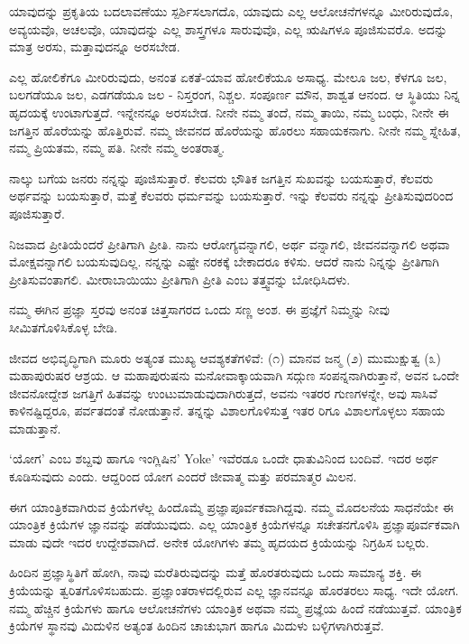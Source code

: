 ಯಾವುದನ್ನು ಪ್ರಕೃತಿಯ ಬದಲಾವಣೆಯು ಸ್ಪರ್ಶಿಸಲಾಗದೊ, ಯಾವುದು ಎಲ್ಲ ಆಲೋಚನೆಗಳನ್ನೂ ಮೀರಿರುವುದೊ, ಅವ್ಯಯವೊ, ಅಚಲವೊ, ಯಾವುದನ್ನು ಎಲ್ಲ ಶಾಸ್ತ್ರಗಳೂ ಸಾರುವುವೊ, ಎಲ್ಲ ಋಷಿಗಳೂ ಪೂಜಿಸುವರೊ. ಅದನ್ನು ಮಾತ್ರ ಅರಸು, ಮತ್ತಾವುದನ್ನೂ ಅರಸಬೇಡ.

ಎಲ್ಲ ಹೋಲಿಕೆಗೂ ಮೀರಿರುವುದು, ಅನಂತ ಏಕತೆ-ಯಾವ ಹೋಲಿಕೆಯೂ ಅಸಾಧ್ಯ. ಮೇಲೂ ಜಲ, ಕೆಳಗೂ ಜಲ, ಬಲಗಡೆಯೂ ಜಲ, ಎಡಗಡೆಯೂ ಜಲ - ನಿಸ್ತರಂಗ, ನಿಶ್ಚಲ. ಸಂಪೂರ್ಣ ಮೌನ, ಶಾಶ್ವತ ಆನಂದ. ಆ ಸ್ಥಿತಿಯು ನಿನ್ನ ಹೃದಯಕ್ಕೆ ಉಂಟಾಗುತ್ತದೆ. ಇನ್ನೇನನ್ನೂ ಅರಸಬೇಡ. ನೀನೇ ನಮ್ಮ ತಂದೆ, ನಮ್ಮ ತಾಯಿ, ನಮ್ಮ ಬಂಧು, ನೀನೇ ಈ ಜಗತ್ತಿನ ಹೊರೆಯನ್ನು ಹೊತ್ತಿರುವೆ. ನಮ್ಮ ಜೀವನದ ಹೊರೆಯನ್ನು ಹೊರಲು ಸಹಾಯಕನಾಗು. ನೀನೇ ನಮ್ಮ ಸ್ನೇಹಿತ, ನಮ್ಮ ಪ್ರಿಯತಮ, ನಮ್ಮ ಪತಿ. ನೀನೇ ನಮ್ಮ ಅಂತರಾತ್ಮ.

ನಾಲ್ಕು ಬಗೆಯ ಜನರು ನನ್ನನ್ನು ಪೂಜಿಸುತ್ತಾರೆ. ಕೆಲವರು ಭೌತಿಕ ಜಗತ್ತಿನ ಸುಖವನ್ನು ಬಯಸುತ್ತಾರೆ, ಕೆಲವರು ಅರ್ಥವನ್ನು ಬಯಸುತ್ತಾರೆ, ಮತ್ತೆ ಕೆಲವರು ಧರ್ಮವನ್ನು ಬಯಸುತ್ತಾರೆ. ಇನ್ನು ಕೆಲವರು ನನ್ನನ್ನು ಪ್ರೀತಿಸುವುದರಿಂದ ಪೂಜಿಸುತ್ತಾರೆ.

ನಿಜವಾದ ಪ್ರೀತಿಯೆಂದರೆ ಪ್ರೀತಿಗಾಗಿ ಪ್ರೀತಿ. ನಾನು ಆರೋಗ್ಯವನ್ನಾಗಲಿ, ಅರ್ಥ ವನ್ನಾಗಲಿ, ಜೀವನವನ್ನಾಗಲಿ ಅಥವಾ ಮೋಕ್ಷವನ್ನಾಗಲಿ ಬಯಸುವುದಿಲ್ಲ. ನನ್ನನ್ನು ಎಷ್ಟೇ ನರಕಕ್ಕೆ ಬೇಕಾದರೂ ಕಳಿಸು. ಆದರೆ ನಾನು ನಿನ್ನನ್ನು ಪ್ರೀತಿಗಾಗಿ ಪ್ರೀತಿಸುವಂತಾಗಲಿ. ಮೀರಾಬಾಯಿಯು ಪ್ರೀತಿಗಾಗಿ ಪ್ರೀತಿ ಎಂಬ ತತ್ತ್ವವನ್ನು ಬೋಧಿಸಿದಳು.

ನಮ್ಮ ಈಗಿನ ಪ್ರಜ್ಞಾ ಸ್ತರವು ಅನಂತ ಚಿತ್ತಸಾಗರದ ಒಂದು ಸಣ್ಣ ಅಂಶ. ಈ ಪ್ರಜ್ಞೆಗೆ ನಿಮ್ಮನ್ನು ನೀವು ಸೀಮಿತಗೊಳಿಸಿಕೊಳ್ಳ ಬೇಡಿ.

ಜೀವದ ಅಭಿವೃದ್ಧಿಗಾಗಿ ಮೂರು ಅತ್ಯಂತ ಮುಖ್ಯ ಆವಶ್ಯಕತೆಗಳಿವೆ: (೧) ಮಾನವ ಜನ್ಮ (೨) ಮುಮುಕ್ಷುತ್ವ (೩) ಮಹಾಪುರುಷರ ಆಶ್ರಯ. ಆ ಮಹಾಪುರುಷನು ಮನೋವಾಕ್ಕಾಯವಾಗಿ ಸದ್ಗುಣ ಸಂಪನ್ನನಾಗಿರುತ್ತಾನೆ, ಅವನ ಒಂದೇ ಜೀವನೋದ್ದೇಶ ಜಗತ್ತಿಗೆ ಹಿತವನ್ನು ಉಂಟುಮಾಡುವುದಾಗಿರುತ್ತದೆ, ಅವನು ಇತರರ ಗುಣಗಳನ್ನೇ, ಅವು ಸಾಸಿವೆ ಕಾಳಿನಷ್ಟಿದ್ದರೂ, ಪರ್ವತದಂತೆ ನೋಡುತ್ತಾನೆ. ತನ್ನನ್ನು ವಿಶಾಲಗೊಳಿಸುತ್ತ ಇತರ ರಿಗೂ ವಿಶಾಲಗೊಳ್ಳಲು ಸಹಾಯ ಮಾಡುತ್ತಾನೆ.

‘ಯೋಗ’ ಎಂಬ ಶಬ್ದವು ಹಾಗೂ ಇಂಗ್ಲಿಷಿನ’ Yoke’ ಇವೆರಡೂ ಒಂದೇ ಧಾತುವಿನಿಂದ ಬಂದಿವೆ. ಇದರ ಅರ್ಥ ಕೂಡಿಸುವುದು ಎಂದು. ಆದ್ದರಿಂದ ಯೋಗ ಎಂದರೆ ಜೀವಾತ್ಮ ಮತ್ತು ಪರಮಾತ್ಮರ ಮಿಲನ.

ಈಗ ಯಾಂತ್ರಿಕವಾಗಿರುವ ಕ್ರಿಯೆಗಳೆಲ್ಲ ಹಿಂದೊಮ್ಮೆ ಪ್ರಜ್ಞಾಪೂರ್ವಕವಾಗಿದ್ದವು. ನಮ್ಮ ಮೊದಲನೆಯ ಸಾಧನೆಯೇ ಈ ಯಾಂತ್ರಿಕ ಕ್ರಿಯೆಗಳ ಜ್ಞಾನವನ್ನು ಪಡೆಯುವುದು. ಎಲ್ಲ ಯಾಂತ್ರಿಕ ಕ್ರಿಯೆಗಳನ್ನೂ ಸಚೇತನಗೊಳಿಸಿ ಪ್ರಜ್ಞಾಪೂರ್ವಕವಾಗಿ ಮಾಡು ವುದೇ ಇದರ ಉದ್ದೇಶವಾಗಿದೆ. ಅನೇಕ ಯೋಗಿಗಳು ತಮ್ಮ ಹೃದಯದ ಕ್ರಿಯೆಯನ್ನು ನಿಗ್ರಹಿಸ ಬಲ್ಲರು.

ಹಿಂದಿನ ಪ್ರಜ್ಞಾಸ್ಥಿತಿಗೆ ಹೋಗಿ, ನಾವು ಮರೆತಿರುವುದನ್ನು ಮತ್ತೆ ಹೊರತರುವುದು ಒಂದು ಸಾಮಾನ್ಯ ಶಕ್ತಿ. ಈ ಕ್ರಿಯೆಯನ್ನು ತ್ವರಿತಗೊಳಿಸಬಹುದು. ಪ್ರಜ್ಞಾಂತರಾಳದಲ್ಲಿರುವ ಎಲ್ಲ ಜ್ಞಾನವನ್ನೂ ಹೊರತರಲು ಸಾಧ್ಯ. ಇದೇ ಯೋಗ. ನಮ್ಮ ಹೆಚ್ಚಿನ ಕ್ರಿಯೆಗಳು ಹಾಗೂ ಆಲೋಚನೆಗಳು ಯಾಂತ್ರಿಕ ಅಥವಾ ನಮ್ಮ ಪ್ರಜ್ಞೆಯ ಹಿಂದೆ ನಡೆಯುತ್ತವೆ. ಯಾಂತ್ರಿಕ ಕ್ರಿಯೆಗಳ ಸ್ಥಾನವು ಮಿದುಳಿನ ಅತ್ಯಂತ ಹಿಂದಿನ ಚಾಚುಭಾಗ  ಹಾಗೂ ಮಿದುಳು ಬಳ್ಳಿಗಳಾಗಿರುತ್ತವೆ.

